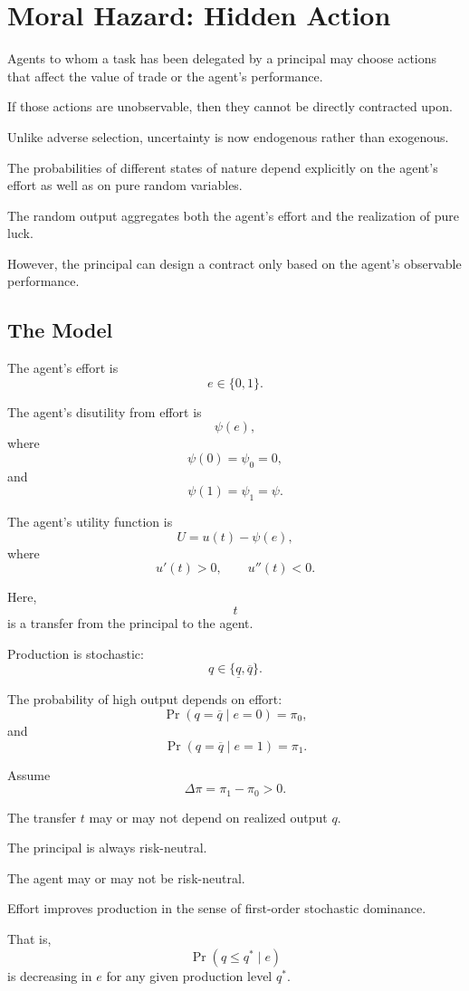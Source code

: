 \section{Moral Hazard: Hidden Action}

Agents to whom a task has been delegated by a principal may choose actions that affect the value of trade or the agent's performance.

If those actions are unobservable, then they cannot be directly contracted upon.

Unlike adverse selection, uncertainty is now endogenous rather than exogenous.

The probabilities of different states of nature depend explicitly on the agent's effort as well as on pure random variables.

The random output aggregates both the agent's effort and the realization of pure luck.

However, the principal can design a contract only based on the agent's observable performance.

\subsection{The Model}

The agent's effort is
\[
e\in\{0,1\}.
\]

The agent's disutility from effort is
\[
\psi(e),
\]
where
\[
\psi(0)=\psi_0=0,
\]
and
\[
\psi(1)=\psi_1=\psi.
\]

The agent's utility function is
\[
U=u(t)-\psi(e),
\]
where
\[
u'(t)>0,
\qquad
u''(t)<0.
\]




Here,
\[
t
\]
is a transfer from the principal to the agent.

Production is stochastic:
\[
q\in\{\underline q,\overline q\}.
\]

The probability of high output depends on effort:
\[
\Pr(q=\overline q\mid e=0)=\pi_0,
\]
and
\[
\Pr(q=\overline q\mid e=1)=\pi_1.
\]

Assume
\[
\Delta\pi=\pi_1-\pi_0>0.
\]

The transfer \(t\) may or may not depend on realized output \(q\).

The principal is always risk-neutral.

The agent may or may not be risk-neutral.

Effort improves production in the sense of first-order stochastic dominance.

That is,
\[
\Pr(q\le q^*\mid e)
\]
is decreasing in \(e\) for any given production level \(q^*\).


